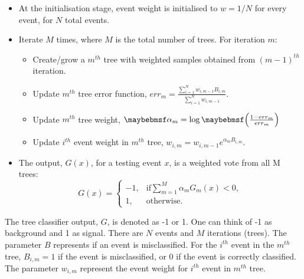 \begin{itemize}
  \item At the initialisation stage,  event weight is initialised to $w = 1 / N$ for every event, for $N$ total events.
  \item Iterate $M$ times, where $M$ is the total number of trees. For iteration $m$:
    \begin{itemize}
      \item Create/grow a $m^{th}$ tree  with weighted samples obtained from $(m-1)^{th}$ iteration.
      \item Update $m^{th}$ tree error function, $err_m = \frac{\sum_{i = 1}^{N} w_{i,m-1} B_{i,m} }{\sum_{i = 1}^{N}w_{i,m-1}}$.
      \item Update $m^{th}$ tree weight,  $\alpha_m = \log\parenths{\frac{1 - err_m}{err_m}}$
      \item Update $i^{th}$ event weight in $m^{th}$ tree, $w_{i,m} = w_{i,m-1} e^{\alpha_m B_{i,m} }$.
    \end{itemize}
  \item The output, $G(x)$, for a testing event $x$, is a weighted vote from all M trees:
  \begin{equation}
    G(x)=
     \begin{cases}
      -1, & \mbox{if} \sum_{m=1}^{M}\alpha_mG_m(x) < 0 , \\
      1, & \mbox{otherwise}.
    \end{cases}
  \end{equation}
\end{itemize}
The tree classifier output, $G$, is denoted as  -1 or 1. One can think of -1 as background and 1 as signal. There are $N$ events and $M$ iterations (trees). The parameter $B$ represents if an event is misclassified. For the $i^{th}$ event in the  $m^{th}$ tree,  $B_{i,m} = 1$ if the event is misclassified, or 0 if the event is correctly classified. The parameter $w_{i,m}$ represent the event weight for $i^{th}$ event  in $m^{th}$ tree.


